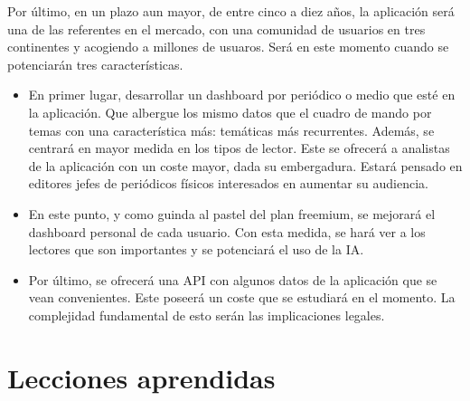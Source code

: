 Por último, en un plazo aun mayor, de entre cinco a diez años, la aplicación será una de las referentes en el mercado, con una comunidad de usuarios en tres continentes y acogiendo a millones de usuaros. Será en este momento cuando se potenciarán tres características.

\begin{itemize}
    \item En primer lugar, desarrollar un dashboard por periódico o medio que esté en la aplicación. Que albergue los mismo datos que el cuadro de mando por temas con una característica más: temáticas más recurrentes. Además, se centrará en mayor medida en los tipos de lector. Este se ofrecerá a analistas de la aplicación con un coste mayor, dada su embergadura. Estará pensado en editores jefes de periódicos físicos interesados en aumentar su audiencia.
    \item En este punto, y como guinda al pastel del plan freemium, se mejorará el dashboard personal de cada usuario. Con esta medida, se hará ver a los lectores que son importantes y se potenciará el uso de la IA.
    \item Por último, se ofrecerá una API con algunos datos de la aplicación que se vean convenientes. Este poseerá un coste que se estudiará en el momento. La complejidad fundamental de esto serán las implicaciones legales.
\end{itemize}

\section{Lecciones aprendidas}\label{sec:lecciones_aprendidas}